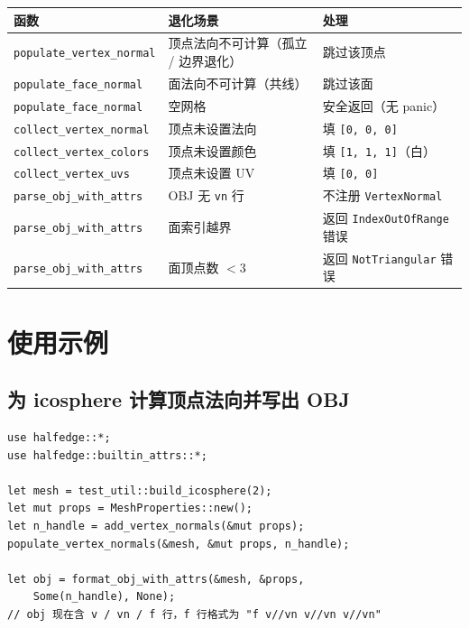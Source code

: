 \documentclass[11pt,a4paper]{article}
\begin{document}
\begin{center}
\renewcommand{\arraystretch}{1.18}
\begin{tabular}{@{}lll@{}}
  \toprule
  \textbf{函数} & \textbf{退化场景} & \textbf{处理} \\
  \midrule
  \texttt{populate\_vertex\_normal} & 顶点法向不可计算（孤立 / 边界退化） & 跳过该顶点 \\
  \texttt{populate\_face\_normal}   & 面法向不可计算（共线） & 跳过该面 \\
  \texttt{populate\_face\_normal}   & 空网格 & 安全返回（无 panic） \\
  \texttt{collect\_vertex\_normal}  & 顶点未设置法向 & 填 \texttt{[0, 0, 0]} \\
  \texttt{collect\_vertex\_colors}  & 顶点未设置颜色 & 填 \texttt{[1, 1, 1]}（白） \\
  \texttt{collect\_vertex\_uvs}     & 顶点未设置 UV & 填 \texttt{[0, 0]} \\
  \texttt{parse\_obj\_with\_attrs}  & OBJ 无 \texttt{vn} 行 & 不注册 \texttt{VertexNormal} \\
  \texttt{parse\_obj\_with\_attrs}  & 面索引越界 & 返回 \texttt{IndexOutOfRange} 错误 \\
  \texttt{parse\_obj\_with\_attrs}  & 面顶点数 $< 3$ & 返回 \texttt{NotTriangular} 错误 \\
  \bottomrule
\end{tabular}
\end{center}

\section{使用示例}

\subsection{为 icosphere 计算顶点法向并写出 OBJ}

\begin{lstlisting}
use halfedge::*;
use halfedge::builtin_attrs::*;

let mesh = test_util::build_icosphere(2);
let mut props = MeshProperties::new();
let n_handle = add_vertex_normals(&mut props);
populate_vertex_normals(&mesh, &mut props, n_handle);

let obj = format_obj_with_attrs(&mesh, &props,
    Some(n_handle), None);
// obj 现在含 v / vn / f 行，f 行格式为 "f v//vn v//vn v//vn"
\end{lstlisting}
\end{document}
